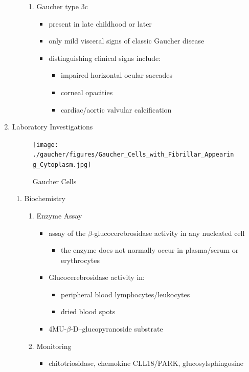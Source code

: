 \documentclass{scrartcl}
\begin{document}
\begin{enumerate}
\begin{enumerate}
\begin{enumerate}
\item Gaucher type 3c
\label{sec:org5aefd72}
\begin{itemize}
\item present in late childhood or later
\item only mild visceral signs of classic Gaucher disease
\item distinguishing clinical signs include:
\begin{itemize}
\item impaired horizontal ocular saccades
\item corneal opacities
\item cardiac/aortic valvular calcification
\end{itemize}
\end{itemize}
\end{enumerate}
\end{enumerate}

\item Laboratory Investigations
\label{sec:org0411898}
\begin{figure}[htbp]
\centering
\texttt{[image: ./gaucher/figures/Gaucher\_Cells\_with\_Fibrillar\_Appearing\_Cytoplasm.jpg]}
\caption{\label{fig:orge2fbe95}
Gaucher Cells}
\end{figure}

\begin{enumerate}
\item Biochemistry
\label{sec:org892e3e4}
\begin{enumerate}
\item Enzyme Assay
\label{sec:orgba8cd5f}
\begin{itemize}
\item assay of the \(\beta\)-glucocerebrosidase activity in any nucleated cell
\begin{itemize}
\item the enzyme does not normally occur in plasma/serum or erythrocytes
\end{itemize}
\item Glucocerebrosidase activity in:
\begin{itemize}
\item peripheral blood lymphocytes/leukocytes
\item dried blood spots
\end{itemize}
\item 4MU-\(\beta\)-D--glucopyranoside substrate
\end{itemize}

\item Monitoring
\label{sec:org9038fad}
\begin{itemize}
\item chitotriosidase, chemokine CLL18/PARK, glucosylsphingosine
\end{itemize}
\end{enumerate}


\end{enumerate}
\end{enumerate}
\end{document}
